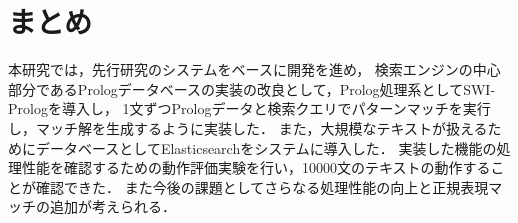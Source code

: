 \documentclass{FITpaper}
\begin{document}
\section{まとめ}
  本研究では，先行研究のシステムをベースに開発を進め，
  検索エンジンの中心部分であるPrologデータベースの実装の改良として，Prolog処理系としてSWI-Prologを導入し，
  1文ずつPrologデータと検索クエリでパターンマッチを実行し，マッチ解を生成するように実装した．
  また，大規模なテキストが扱えるためにデータベースとしてElasticsearchをシステムに導入した．
  実装した機能の処理性能を確認するための動作評価実験を行い，10000文のテキストの動作することが確認できた．
  また今後の課題としてさらなる処理性能の向上と正規表現マッチの追加が考えられる．







%

%
\end{document}
